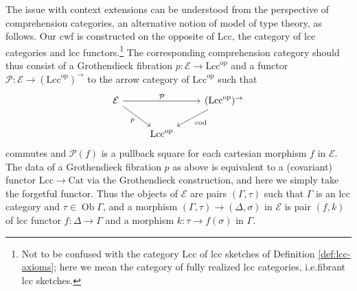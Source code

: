 \documentclass[a4paper]{article}
\theoremstyle{remark}
\theoremstyle{definition}
\begin{document}
The issue with context extensions can be understood from the perspective of comprehension categories, an alternative notion of model of type theory, as follows.
Our cwf is constructed on the opposite of $\mathrm{Lcc}$, the category of lcc categories and lcc functors.\footnote{
  Not to be confused with the category $\mathrm{Lcc}$ of lcc sketches of Definition \ref{def:lcc-axioms}; here we mean the category of fully realized lcc categories, i.e.\@ fibrant lcc sketches.
}
The corresponding comprehension category should thus consist of a Grothendieck fibration $p : \mathcal{E} \rightarrow \mathrm{Lcc}^\mathrm{op}$ and a functor $\mathcal{P} : \mathcal{E} \rightarrow (\mathrm{Lcc}^\mathrm{op})^\rightarrow$ to the arrow category of $\mathrm{Lcc}^\mathrm{op}$ such that
\begin{equation}
  \begin{tikzcd}
    \mathcal{E} \arrow[rr, "\mathcal{P}"] \arrow[dr, "p"'] & & (\mathrm{Lcc}^\mathrm{op})^{\rightarrow} \arrow[dl, "\mathrm{cod}"] \\
    & \mathrm{Lcc}^\mathrm{op}
  \end{tikzcd}
\end{equation}
commutes and $\mathcal{P}(f)$ is a pullback square for each cartesian morphism $f$ in $\mathcal{E}$.
The data of a Grothendieck fibration $p$ as above is equivalent to a (covariant) functor $\mathrm{Lcc} \rightarrow \mathrm{Cat}$ via the Grothendieck construction, and here we simply take the forgetful functor.
Thus the objects of $\mathcal{E}$ are pairs $(\Gamma, \tau)$ such that $\Gamma$ is an lcc category and $\tau \in \operatorname{Ob} \Gamma$, and a morphism $(\Gamma, \tau) \rightarrow (\Delta, \sigma)$ in $\mathcal{E}$ is pair $(f, k)$ of lcc functor $f : \Delta \rightarrow \Gamma$ and a morphism $k : \tau \rightarrow f(\sigma)$ in $\Gamma$.
\end{document}
